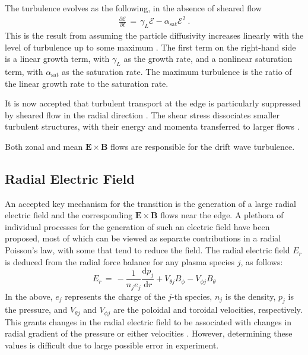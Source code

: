 The turbulence evolves as the following, in the absence of sheared flow
\begin{align} %
	\frac{\partial\mathcal{E}}{\partial t} \,=\, \gamma_L\mathcal{E} - \alpha_\text{sat}\mathcal{E}^2~.
	\label{eq:turbulence_ode}
\end{align}
This is the result from assuming the particle diffusivity increases linearly with the level of turbulence up to some maximum \cite{diamond_dynamics_1995}.
The first term on the right-hand side is a linear growth term, with $\gamma_L$ as the growth rate, and a nonlinear saturation term, with $\alpha_\text{sat}$ as the saturation rate.
The maximum turbulence is the ratio of the linear growth rate to the saturation rate.

It is now accepted that turbulent transport at the edge is particularly suppressed by sheared flow in the radial direction \cite{terry_suppression_2000}.
The shear stress dissociates smaller turbulent structures, with their energy and momenta transferred to larger flows \cite{staps_backstepping_2017}.

Both zonal and mean $\mathbf{E}\times\mathbf{B}$ flows are responsible for the drift wave turbulence.

\subsection{Radial Electric Field}\label{ssec:E_r}
An accepted key mechanism for the transition is the generation of a large radial electric field and the corresponding $\mathbf{E}\times\mathbf{B}$ flows near the edge.
A plethora of individual processes for the generation of such an electric field have been proposed, most of which can be viewed as separate contributions in a radial Poisson's law, with some that tend to reduce the field.
The radial electric field $E_r$ is deduced from the radial force balance for any plasma species $j$, as follows:
\begin{equation}
	E_r \,=\, -\frac{1}{n_j e_j} \frac{\text{d} p_j}{\text{d} r} + V_{\theta j} B_\phi - V_{\phi j} B_\theta
	\label{eq:E_r}
\end{equation}
In the above, $e_j$ represents the charge of the $j$-th species, $n_j$ is the density, $p_j$ is the pressure, and $V_{\theta j}$ and $V_{\phi j}$ are the poloidal and toroidal velocities, respectively.
This grants changes in the radial electric field to be associated with changes in radial gradient of the pressure or either velocities \cite{connor_review_2000}\cite{staps_backstepping_2017}.
However, determining these values is difficult due to large possible error in experiment.

